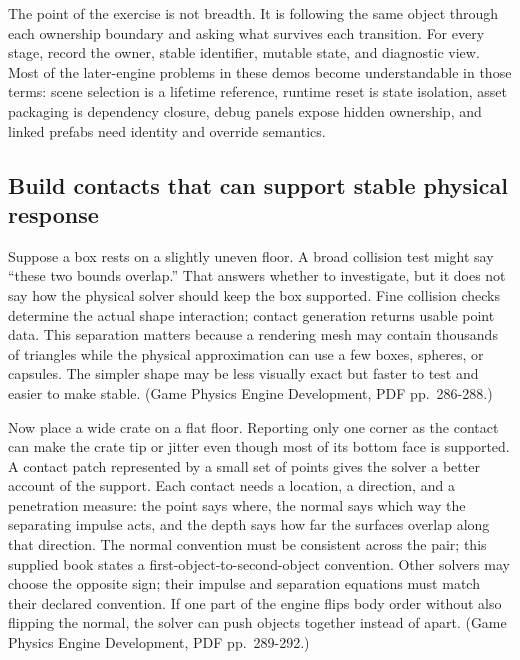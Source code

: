 The point of the exercise is not breadth. It is following the same object through each ownership boundary and asking what survives each transition. For every stage, record the owner, stable identifier, mutable state, and diagnostic view. Most of the later-engine problems in these demos become understandable in those terms: scene selection is a lifetime reference, runtime reset is state isolation, asset packaging is dependency closure, debug panels expose hidden ownership, and linked prefabs need identity and override semantics.

\subsection{Build contacts that can support stable physical response}\label{06-engine-ii-ch033-build-contacts-that-can-support-stable-physical-response}

\hypertarget{06-engine-ii-ch033-build-contacts-that-can-support-stable-physical-response}{}

Suppose a box rests on a slightly uneven floor. A broad collision test might say ``these two bounds overlap.'' That answers whether to investigate, but it does not say how the physical solver should keep the box supported. Fine collision checks determine the actual shape interaction; contact generation returns usable point data. This separation matters because a rendering mesh may contain thousands of triangles while the physical approximation can use a few boxes, spheres, or capsules. The simpler shape may be less visually exact but faster to test and easier to make stable. (Game Physics Engine Development, PDF pp.~286-288.)

Now place a wide crate on a flat floor. Reporting only one corner as the contact can make the crate tip or jitter even though most of its bottom face is supported. A contact patch represented by a small set of points gives the solver a better account of the support. Each contact needs a location, a direction, and a penetration measure: the point says where, the normal says which way the separating impulse acts, and the depth says how far the surfaces overlap along that direction. The normal convention must be consistent across the pair; this supplied book states a first-object-to-second-object convention. Other solvers may choose the opposite sign; their impulse and separation equations must match their declared convention. If one part of the engine flips body order without also flipping the normal, the solver can push objects together instead of apart. (Game Physics Engine Development, PDF pp.~289-292.)

